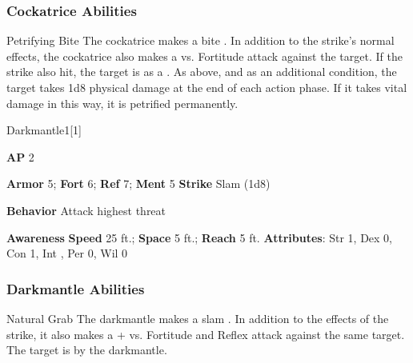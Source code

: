 \subsubsection{Cockatrice Abilities}

\begin{freeability}{Petrifying Bite}
The cockatrice makes a bite .
In addition to the strike's normal effects, the cockatrice also makes a  vs. Fortitude attack against the target.
\hit If the strike also hit, the target is  as a .
\crit As above, and as an additional condition, the target takes 1d8 physical damage at the end of each action phase.
If it takes vital damage in this way, it is petrified permanently.
\end{freeability}

\begin{monsection}{Darkmantle}{1}[1]
\vspace{-1em}\vspace{-1em}
\begin{spellcontent}
\begin{spelltargetinginfo}
{\textbf{AP} 2}

\pari \textbf{Armor} 5;
\textbf{Fort} 6;
\textbf{Ref} 7;
\textbf{Ment} 5
\pari \textbf{Strike} Slam  (1d8)



\pari \textbf{Behavior} Attack highest threat
\end{spelltargetinginfo}
\end{spellcontent}

\begin{monsterfooter}
\pari \textbf{Awareness} 
\pari \textbf{Speed} 25 ft.;
\textbf{Space} 5 ft.;
\textbf{Reach} 5 ft.
\pari \textbf{Attributes}:
Str 1,
Dex 0,
Con 1,
Int ,
Per 0,
Wil 0
\end{monsterfooter}
\end{monsection}


\subsubsection{Darkmantle Abilities}

\begin{freeability}{Natural Grab}
The darkmantle makes a slam .
In addition to the effects of the strike, it also makes a + vs. Fortitude and Reflex attack against the same target.
\hit The target is  by the darkmantle.
\end{freeability}

